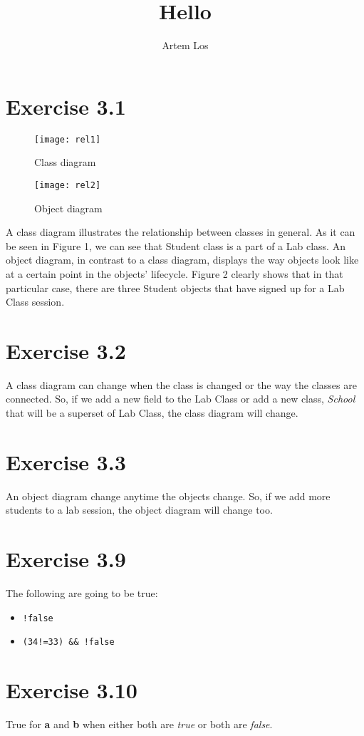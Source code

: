 \documentclass[10pt,a4paper]{article}
\author{Artem Los}
\title{Hello}
\begin{document}
\section*{Exercise 3.1}

\begin{figure}[h]
\center
\texttt{[image: rel1]}
\caption{Class diagram}
\end{figure}
\begin{figure}[h]
\center
\texttt{[image: rel2]}
\caption{Object diagram}
\end{figure}
A class diagram illustrates the relationship between classes in general. As it can be seen in Figure 1, we can see that Student class is a part of a Lab class. An object diagram, in contrast to a class diagram, displays the way objects look like at a certain point in the objects' lifecycle. Figure 2 clearly shows that in that particular case, there are three Student objects that have signed up for a Lab Class session.

\section*{Exercise 3.2}
A class diagram can change when the class is changed or the way the classes are connected. So, if we add a new field to the Lab Class or add a new class, \textit{School} that will be a superset of Lab Class, the class diagram will change.

\section*{Exercise 3.3}
An object diagram change anytime the objects change. So, if we add more students to a lab session, the object diagram will change too. 


\section*{Exercise 3.9}
The following are going to be true:
\begin{itemize}
\item \verb|!false|
\item \verb|(34!=33) && !false|
\end{itemize}

\section*{Exercise 3.10}
True for \textbf{a} and \textbf{b} when either both are \textit{true} or both are \textit{false}.
\end{document}
